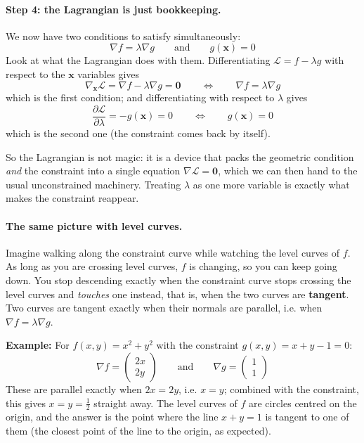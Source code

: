\documentclass[]{article}
\begin{document}
	\paragraph{Step 4: the Lagrangian is just bookkeeping.}
	We now have two conditions to satisfy simultaneously:
	$$
	\nabla f = \lambda \nabla g
	\qquad \text{and} \qquad
	g(\mathbf{x}) = 0
	$$
	Look at what the Lagrangian does with them.
	Differentiating $\mathcal{L} = f - \lambda g$ with respect to the $\mathbf{x}$ variables gives
	$$
	\nabla_\mathbf{x} \mathcal{L} = \nabla f - \lambda \nabla g = \mathbf{0}
	\qquad \Longleftrightarrow \qquad
	\nabla f = \lambda \nabla g
	$$
	which is the first condition; and differentiating with respect to $\lambda$ gives
	$$
	\frac{\partial \mathcal{L}}{\partial \lambda} = -g(\mathbf{x}) = 0
	\qquad \Longleftrightarrow \qquad
	g(\mathbf{x}) = 0
	$$
	which is the second one (the constraint comes back by itself).

	So the Lagrangian is not magic: it is a device that packs the geometric condition \textit{and} the constraint into a single equation $\nabla \mathcal{L} = \mathbf{0}$, which we can then hand to the usual unconstrained machinery.
	Treating $\lambda$ as one more variable is exactly what makes the constraint reappear.

	\paragraph{The same picture with level curves.}
	Imagine walking along the constraint curve while watching the level curves of $f$.
	As long as you are crossing level curves, $f$ is changing, so you can keep going down.
	You stop descending exactly when the constraint curve stops crossing the level curves and \textit{touches} one instead, that is, when the two curves are \textbf{tangent}.
	Two curves are tangent exactly when their normals are parallel, i.e. when $\nabla f = \lambda \nabla g$.

	\vspace{1cm}
	\textbf{Example:}
	For $f(x,y) = x^2+y^2$ with the constraint $g(x,y) = x + y - 1 = 0$:
	$$
	\nabla f = \begin{pmatrix} 2x \\ 2y \end{pmatrix}
	\qquad \text{and} \qquad
	\nabla g = \begin{pmatrix} 1 \\ 1 \end{pmatrix}
	$$
	These are parallel exactly when $2x = 2y$, i.e. $x = y$; combined with the constraint, this gives $x = y = \frac{1}{2}$ straight away.
	The level curves of $f$ are circles centred on the origin, and the answer is the point where the line $x+y=1$ is tangent to one of them (the closest point of the line to the origin, as expected).
\end{document}
